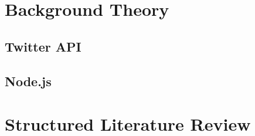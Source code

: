\section{Background Theory}

	\subsection{Twitter API}
	
	
	\subsection{Node.js}
		

\section{Structured Literature Review}
